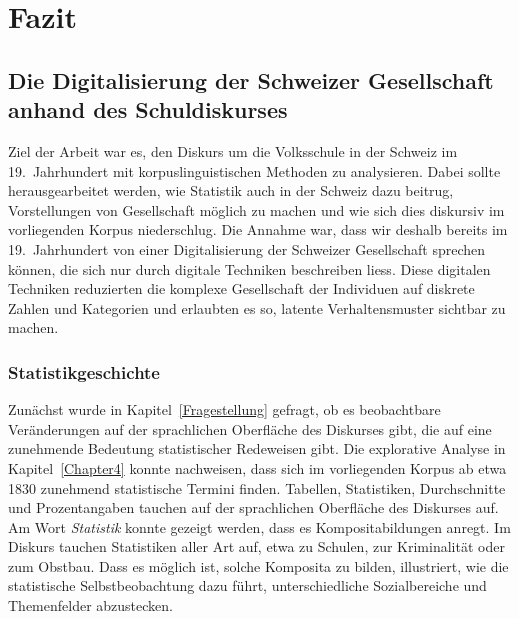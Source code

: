 


\chapter{Fazit} %

\label{Chapter7} %


\section{Die Digitalisierung der Schweizer Gesellschaft anhand des Schuldiskurses}

Ziel der Arbeit war es, den Diskurs um die Volksschule in der Schweiz im 19.~Jahrhundert mit korpuslinguistischen Methoden zu analysieren. Dabei sollte herausgearbeitet werden, wie Statistik auch in der Schweiz dazu beitrug, Vorstellungen von Gesellschaft möglich zu machen und wie sich dies diskursiv im vorliegenden Korpus niederschlug. Die Annahme war, dass wir deshalb bereits im 19.~Jahrhundert von einer Digitalisierung der Schweizer Gesellschaft sprechen können, die sich nur durch digitale Techniken beschreiben liess. Diese digitalen Techniken reduzierten die komplexe Gesellschaft der Individuen auf diskrete Zahlen und Kategorien und erlaubten es so, latente Verhaltensmuster sichtbar zu machen.

\subsection{Statistikgeschichte}

Zunächst wurde in Kapitel~\ref{Fragestellung} gefragt, ob es beobachtbare Veränderungen auf der sprachlichen Oberfläche des Diskurses gibt, die auf eine zunehmende Bedeutung statistischer Redeweisen gibt. Die explorative Analyse in Kapitel~\ref{Chapter4} konnte nachweisen, dass sich im vorliegenden Korpus ab etwa 1830 zunehmend statistische Termini finden. Tabellen, Statistiken, Durchschnitte und Prozentangaben tauchen auf der sprachlichen Oberfläche des Diskurses auf. Am Wort \textit{Statistik} konnte gezeigt werden, dass es Kompositabildungen anregt. Im Diskurs tauchen Statistiken aller Art auf, etwa zu Schulen, zur Kriminalität oder zum Obstbau. Dass es möglich ist, solche Komposita zu bilden, illustriert, wie die statistische Selbstbeobachtung dazu führt, unterschiedliche Sozialbereiche und Themenfelder abzustecken.

